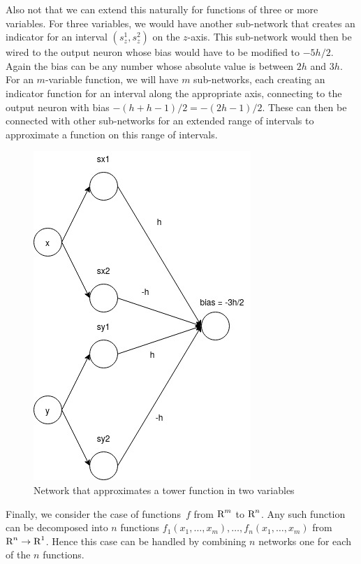 Also not that we can extend this naturally for functions of three or more variables. For three 
variables, we would have another sub-network that creates an indicator for an interval 
$(s_z^1, s_z^2)$ on the $z$-axis. This sub-network would then be wired to the output neuron whose
bias would have to be modified to $-5h/2$. Again the bias can be any number whose absolute value 
is between $2h$ and $3h$. For an $m$-variable function, we will have $m$ sub-networks, each 
creating an indicator function for an interval along the appropriate axis, connecting 
to the output neuron with bias $- (h + h - 1)/2 = - (2h - 1) / 2$. These can then be connected 
with other sub-networks for an extended range of intervals to approximate a function on this
range of intervals.     
\begin{figure}[ht]
\begin{center}
\includegraphics[scale=0.5]{TowerFunction.jpg}
\end{center}
\caption{Network that approximates a tower function in two variables}
\label{fig:tower_function}
\end{figure}

Finally, we consider the case of functions~$f$ from $\text{R}^m$ to $\text{R}^n$. Any such function can be 
decomposed into $n$ functions $f_1(x_1, \ldots, x_m), \ldots, f_n(x_1, \ldots, x_m)$ 
from $\text{R}^n \to \text{R}^1$. Hence this case can be handled by combining 
$n$ networks one for each of the $n$ functions.  



